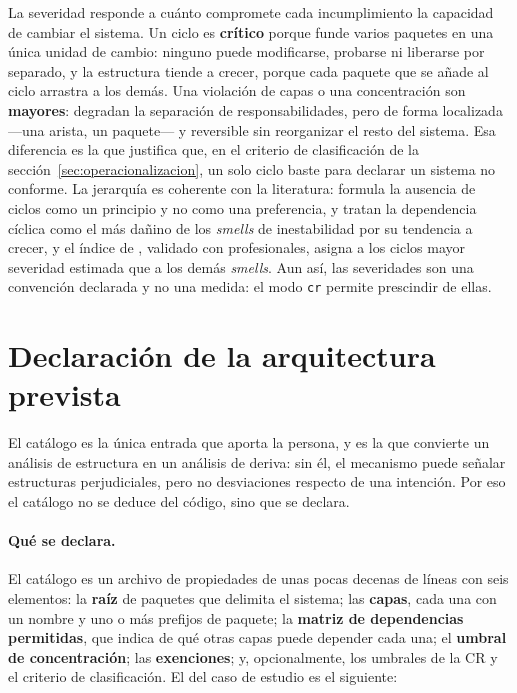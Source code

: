 La severidad responde a cuánto compromete cada incumplimiento la capacidad de cambiar el sistema. Un ciclo es \textbf{crítico} porque funde varios paquetes en una única unidad de cambio: ninguno puede modificarse, probarse ni liberarse por separado, y la estructura tiende a crecer, porque cada paquete que se añade al ciclo arrastra a los demás. Una violación de capas o una concentración son \textbf{mayores}: degradan la separación de responsabilidades, pero de forma localizada ---una arista, un paquete--- y reversible sin reorganizar el resto del sistema. Esa diferencia es la que justifica que, en el criterio de clasificación de la sección~\ref{sec:operacionalizacion}, un solo ciclo baste para declarar un sistema no conforme. La jerarquía es coherente con la literatura: \citet{Martin2003} formula la ausencia de ciclos como un principio y no como una preferencia, \citet{ArcelliFontana2016} y \citet{Sas2019} tratan la dependencia cíclica como el más dañino de los \textit{smells} de inestabilidad por su tendencia a crecer, y el índice de \citet{SasAvgeriou}, validado con profesionales, asigna a los ciclos mayor severidad estimada que a los demás \textit{smells}. Aun así, las severidades son una convención declarada y no una medida: el modo \texttt{cr} permite prescindir de ellas.

\section{Declaración de la arquitectura prevista}
\label{sec:declaracion}
El catálogo es la única entrada que aporta la persona, y es la que convierte un análisis de estructura en un análisis de deriva: sin él, el mecanismo puede señalar estructuras perjudiciales, pero no desviaciones respecto de una intención. Por eso el catálogo no se deduce del código, sino que se declara.

\paragraph{Qué se declara.} El catálogo es un archivo de propiedades de unas pocas decenas de líneas con seis elementos: la \textbf{raíz} de paquetes que delimita el sistema; las \textbf{capas}, cada una con un nombre y uno o más prefijos de paquete; la \textbf{matriz de dependencias permitidas}, que indica de qué otras capas puede depender cada una; el \textbf{umbral de concentración}; las \textbf{exenciones}; y, opcionalmente, los umbrales de la CR y el criterio de clasificación. El del caso de estudio es el siguiente:

